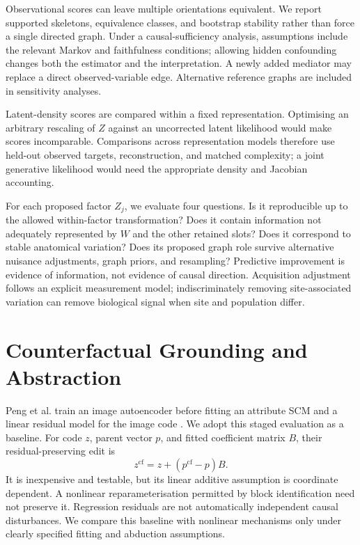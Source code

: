 \documentclass[10pt,twocolumn,letterpaper]{article}
\newcommand{\cf}{\mathrm{cf}}
\begin{document}
Observational scores can leave multiple orientations equivalent. We report supported skeletons, equivalence classes, and bootstrap stability rather than force a single directed graph. Under a causal-sufficiency analysis, assumptions include the relevant Markov and faithfulness conditions; allowing hidden confounding changes both the estimator and the interpretation. A newly added mediator may replace a direct observed-variable edge. Alternative reference graphs are included in sensitivity analyses.

Latent-density scores are compared within a fixed representation. Optimising an arbitrary rescaling of $Z$ against an uncorrected latent likelihood would make scores incomparable. Comparisons across representation models therefore use held-out observed targets, reconstruction, and matched complexity; a joint generative likelihood would need the appropriate density and Jacobian accounting.

For each proposed factor $Z_j$, we evaluate four questions. Is it reproducible up to the allowed within-factor transformation? Does it contain information not adequately represented by $W$ and the other retained slots? Does it correspond to stable anatomical variation? Does its proposed graph role survive alternative nuisance adjustments, graph priors, and resampling? Predictive improvement is evidence of information, not evidence of causal direction. Acquisition adjustment follows an explicit measurement model; indiscriminately removing site-associated variation can remove biological signal when site and population differ.

\section{Counterfactual Grounding and Abstraction}
\label{sec:counterfactual}

Peng et al. train an image autoencoder before fitting an attribute SCM and a linear residual model for the image code \cite{peng2026}. We adopt this staged evaluation as a baseline. For code $z$, parent vector $p$, and fitted coefficient matrix $B$, their residual-preserving edit is
\begin{equation}
 z^{\cf}=z+(p^{\cf}-p)B.
\end{equation}
It is inexpensive and testable, but its linear additive assumption is coordinate dependent. A nonlinear reparameterisation permitted by block identification need not preserve it. Regression residuals are not automatically independent causal disturbances. We compare this baseline with nonlinear mechanisms only under clearly specified fitting and abduction assumptions.
\end{document}

